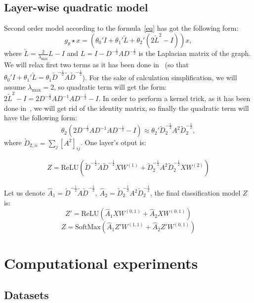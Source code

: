 \documentclass{article}
\begin{document}
\subsection{Layer-wise quadratic model}
Second order model according to the formula~\ref{eq} has got the following form:
\[
g_\theta \star x = (\theta_0' I + \theta_1' \tilde{L} + \theta_2' (2 \tilde{L}^2 - I))x, 
\]
where $\tilde{L} = \frac{2}{\lambda_{\max}} L - I$ and $L = I - D^{-\frac12} A D^{-\frac12}$ is the Laplacian matrix of the graph. We will relax first two terms as it has been done in~\cite{GCN} (so that $\theta_0' I + \theta_1' \tilde{L} = \theta_1 \tilde{D}^{-\frac12} \tilde{A} \tilde{D}^{-\frac12} $). For the sake of calculation simplification, we will assume $\lambda_{\max} = 2$, so quadratic term will get the form: $ 2 \tilde{L}^2 - I = 2 D^{-\frac12} A D^{-1} A D^{-\frac12} - I$. In order to perform a kernel trick, as it has been done in~\cite{GCN}, we will get rid of the identity matrix, so finally the quadratic term will have the following form:
$$
\theta_2 (2 D^{-\frac12} A D^{-1} A D^{-\frac12} - I) \approx \theta_2' \tilde{D}_2^{-\frac12} A^2 \tilde{D}_2^{-\frac12},
$$
where $\tilde{D}_{2, ii} = \sum_j [A^2]_{ij}$. One layer's otput is:

\begin{align*}
Z = \text{ReLU} (\tilde{D}^{-\frac12} \tilde{A} \tilde{D}^{-\frac12} X W^{(1)} + \tilde{D}_2^{-\frac12} A^2 \tilde{D}_2^{-\frac12} X W^{(2)} )
\end{align*}

Let us denote $\hat{A}_1 = \tilde{D}^{-\frac12} \tilde{A} \tilde{D}^{-\frac12}, \ \hat{A}_2 = \tilde{D}_2^{-\frac12} A^2 \tilde{D}_2^{-\frac12}$, the final classification model $Z$ is:
$$
Z' = \text{ReLU} (\hat{A}_1 X W^{(0, 1)} + \hat{A}_2 X W^{(0, 1)})
$$
$$
Z = \text{SoftMax}(\hat{A}_1 Z' W^{(1, 1)} + \hat{A}_2 Z' W^{(0, 1)})
$$

\section{Computational experiments}

\subsection{Datasets}
\end{document}
